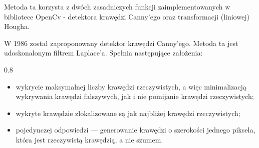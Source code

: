 \documentclass[a4paper,12pt]{article}
\newcommand\spacingInSimpleItemize{0.8}
\begin{document}
		        Metoda ta korzysta z dwóch zasadniczych funkcji zaimplementowanych w bibliotece OpenCv - detektora krawędzi Canny'ego oraz transformacji (liniowej) Hougha. \par
		
		
		        W 1986 został zaproponowany detektor krawędzi Canny'ego. Metoda ta jest udoskonalonym filtrem Laplace'a. Spełnia następujące założenia: 
		        \begin{spacing}{\spacingInSimpleItemize}
    		        \begin{itemize}
    		            \item wykrycie maksymalnej liczby krawędzi rzeczywistych, a więc minimalizacją wykrywania krawędzi fałszywych, jak i nie pomijanie krawędzi rzeczywistych;
    		            \item wykryte krawędzie  zlokalizowane są jak najbliżej krawędzi rzeczywistych;
    		            \item pojedynczej odpowiedzi --- generowanie krawędzi o szerokości jednego piksela, która jest rzeczywistą krawędzią, a nie szumem.
    		        \end{itemize}
		        \end{spacing}
		        
\end{document}
